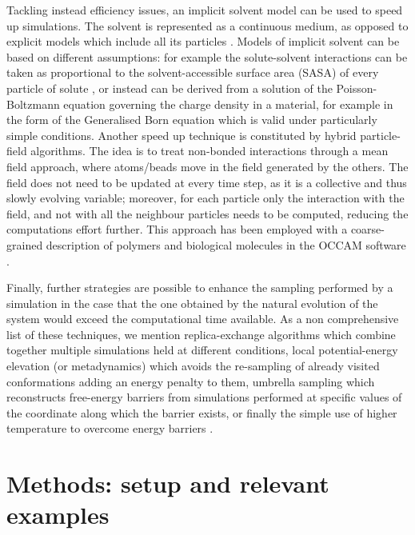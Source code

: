 \documentclass[graybox]{svmult}
\begin{document}
Tackling instead efficiency issues, an implicit solvent model can be used to speed up simulations. The solvent is represented as a continuous medium, as opposed to explicit models which include all its particles \cite{Kleinjung2014}.
%
Models of implicit solvent can be based on different assumptions: for example the solute-solvent interactions can be taken as proportional to the solvent-accessible surface area (SASA) of every particle of solute \cite{Fraternali1996,Kleinjung2003,Kleinjung2012,Fornili2012}, or instead can be derived from a solution of the Poisson-Boltzmann equation governing the charge density in a material, for example in the form of the Generalised Born equation \cite{Zhu2005} which is valid under particularly simple conditions.
%
Another speed up technique is constituted by hybrid particle-field algorithms. The idea is to treat non-bonded interactions through a mean field approach, where atoms/beads move in the field generated by the others. The field does not need to be updated at every time step, as it is a collective and thus slowly evolving variable; moreover, for each particle only the interaction with the field, and not with all the neighbour particles needs to be computed, reducing the computations effort further. This approach has been employed with a coarse-grained description of polymers and biological molecules in the OCCAM software \cite{Milano2009}.

Finally, further strategies are possible to enhance the sampling performed by a simulation in the case that the one obtained by the natural evolution of the system would exceed the computational time available. As a non comprehensive list of these techniques, we mention replica-exchange algorithms \cite{Okamoto2004} which combine together multiple simulations held at different conditions, local potential-energy elevation (or metadynamics) \cite{Huber1994,Laio2002} which avoids the re-sampling of already visited conformations adding an energy penalty to them, umbrella sampling \cite{Torrie1977} which reconstructs free-energy barriers from simulations performed at specific values of the coordinate along which the barrier exists, or finally the simple use of higher temperature to overcome energy barriers \cite{Kirkpatrick1983}.

\section{Methods: setup and relevant examples} \label{sec:methods}
\end{document}
